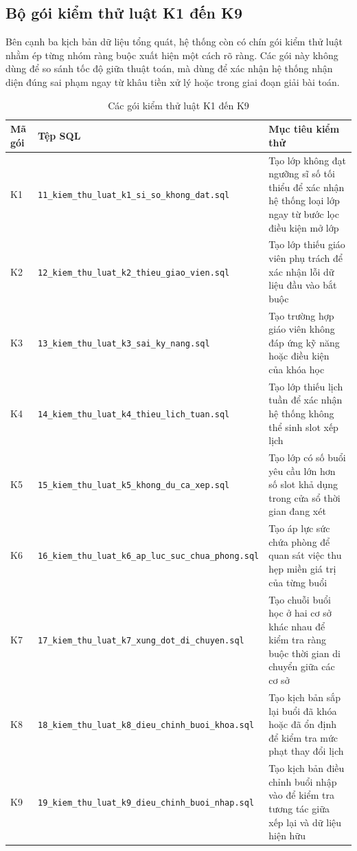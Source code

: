 \documentclass[../DoAn.tex]{subfiles}
\begin{document}
\subsection{Bộ gói kiểm thử luật K1 đến K9}
Bên cạnh ba kịch bản dữ liệu tổng quát, hệ thống còn có chín gói kiểm thử luật nhằm ép từng nhóm ràng buộc xuất hiện một cách rõ ràng. Các gói này không dùng để so sánh tốc độ giữa thuật toán, mà dùng để xác nhận hệ thống nhận diện đúng sai phạm ngay từ khâu tiền xử lý hoặc trong giai đoạn giải bài toán.

\begin{table}[H]
\centering
\caption{Các gói kiểm thử luật K1 đến K9}
\label{table:bang5.6}
\scriptsize
\begin{tabular}{|l|p{4cm}|p{7cm}|}
\hline
\textbf{Mã gói} & \textbf{Tệp SQL} & \textbf{Mục tiêu kiểm thử} \\ \hline
K1 & \texttt{11\_kiem\_thu\_luat\_k1\_si\_so\_khong\_dat.sql} & Tạo lớp không đạt ngưỡng sĩ số tối thiểu để xác nhận hệ thống loại lớp ngay từ bước lọc điều kiện mở lớp \\ \hline
K2 & \texttt{12\_kiem\_thu\_luat\_k2\_thieu\_giao\_vien.sql} & Tạo lớp thiếu giáo viên phụ trách để xác nhận lỗi dữ liệu đầu vào bắt buộc \\ \hline
K3 & \texttt{13\_kiem\_thu\_luat\_k3\_sai\_ky\_nang.sql} & Tạo trường hợp giáo viên không đáp ứng kỹ năng hoặc điều kiện của khóa học \\ \hline
K4 & \texttt{14\_kiem\_thu\_luat\_k4\_thieu\_lich\_tuan.sql} & Tạo lớp thiếu lịch tuần để xác nhận hệ thống không thể sinh slot xếp lịch \\ \hline
K5 & \texttt{15\_kiem\_thu\_luat\_k5\_khong\_du\_ca\_xep.sql} & Tạo lớp có số buổi yêu cầu lớn hơn số slot khả dụng trong cửa sổ thời gian đang xét \\ \hline
K6 & \texttt{16\_kiem\_thu\_luat\_k6\_ap\_luc\_suc\_chua\_phong.sql} & Tạo áp lực sức chứa phòng để quan sát việc thu hẹp miền giá trị của từng buổi \\ \hline
K7 & \texttt{17\_kiem\_thu\_luat\_k7\_xung\_dot\_di\_chuyen.sql} & Tạo chuỗi buổi học ở hai cơ sở khác nhau để kiểm tra ràng buộc thời gian di chuyển giữa các cơ sở \\ \hline
K8 & \texttt{18\_kiem\_thu\_luat\_k8\_dieu\_chinh\_buoi\_khoa.sql} & Tạo kịch bản sắp lại buổi đã khóa hoặc đã ổn định để kiểm tra mức phạt thay đổi lịch \\ \hline
K9 & \texttt{19\_kiem\_thu\_luat\_k9\_dieu\_chinh\_buoi\_nhap.sql} & Tạo kịch bản điều chỉnh buổi nhập vào để kiểm tra tương tác giữa xếp lại và dữ liệu hiện hữu \\ \hline
\end{tabular}
\end{table}
\end{document}
